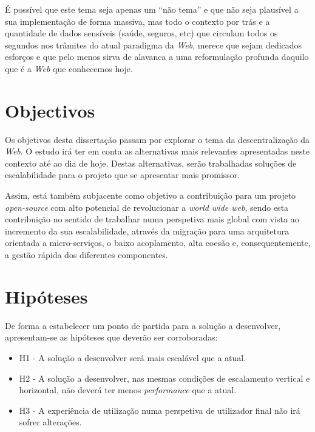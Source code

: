 É possível que este tema seja apenas um “não tema” e que não seja plausível a sua implementação de forma massiva, mas todo o contexto por trás e a quantidade de dados sensíveis (saúde, seguros, etc) que circulam todos os segundos nos trâmites do atual paradigma da \emph{Web},
merece que sejam dedicados esforços e que pelo menos sirva de alavanca a uma reformulação profunda daquilo que é a \emph{Web} que conhecemos hoje\cite{why_web_decentralization_future}.

\section{Objectivos \label{objetivos}}
Os objetivos desta dissertação passam por explorar o tema da descentralização da \emph{Web}. O estudo irá ter em conta as alternativas mais relevantes apresentadas neste contexto até ao dia de hoje. Destas alternativas, serão trabalhadas soluções de escalabilidade para o projeto que se apresentar mais promissor.

Assim, está também subjacente como objetivo a contribuição para um projeto \emph{open-source} com alto potencial de revolucionar a \emph{world wide web}, sendo esta contribuição no sentido de trabalhar numa perspetiva mais global com vista ao incremento da sua escalabilidade, através da migração para uma arquitetura orientada a micro-serviços, o baixo acoplamento, alta coesão e, consequentemente, a gestão rápida dos diferentes componentes.

\section{Hipóteses \label{section_hypothesis}}
De forma a estabelecer um ponto de partida para a solução a desenvolver, apresentam-se as hipóteses que deverão ser corroboradas:
\begin{itemize}
    \item H1 - A solução a desenvolver será mais escalável que a atual.
    \item H2 - A solução a desenvolver, nas mesmas condições de escalamento vertical e horizontal, não deverá ter menos \emph{performance} que a atual.
    \item H3 - A experiência de utilização numa perspetiva de utilizador final não irá sofrer alterações.
\end{itemize}

